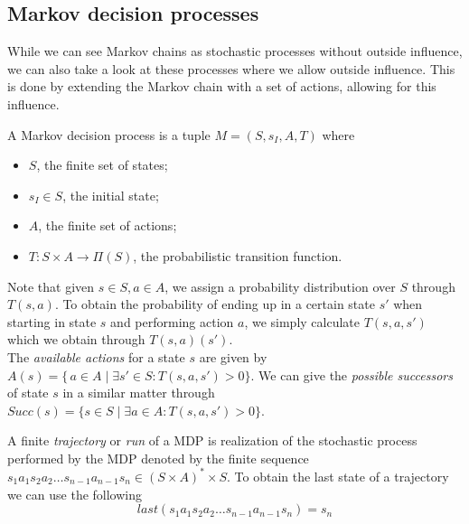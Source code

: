 \subsection*{Markov decision processes}
While we can see Markov chains as stochastic processes without outside influence, we can also take a look at these processes where we allow outside influence. This is done by extending the Markov chain with a set of actions, allowing for this influence. 
\begin{definition}[MDP]
	A Markov decision process is a tuple $M=(S,s_I,A,T)$ where 
	\begin{itemize}
		\item $S$, the finite set of states;
		\item $s_I\in S$, the initial state;
		\item $A$, the finite set of actions;
		\item $T:S\times A\to \Pi(S)$, the probabilistic transition function.
	\end{itemize}
\end{definition}

Note that given $s\in S,a\in A$, we assign a probability distribution over $S$ through $T(s,a)$. To obtain the probability of ending up in a certain state $s'$ when starting in state $s$ and performing action $a$, we simply calculate $T(s,a,s')$ which we obtain through $T(s,a)(s')$.\\

The \textit{available actions} for a state $s$ are given by $A(s)=\{\,a\in A\mid \exists s'\in S: T(s,a,s')>0\}$. We can give the \textit{possible successors} of state $s$ in a similar matter through $Succ(s)=\{s\in S\mid\exists a\in A : T(s,a,s')>0\}$.

A finite \textit{trajectory} or \textit{run} of a MDP is realization of the stochastic process performed by the MDP denoted by the finite sequence $s_1 a_1 s_2 a_2\dots s_{n-1} a_{n-1} s_n \in (S\times A)^*\times S$. To obtain the last state of a trajectory we can use the following \[last(s_1 a_1 s_2 a_2\dots s_{n-1} a_{n-1} s_n)=s_n\]

